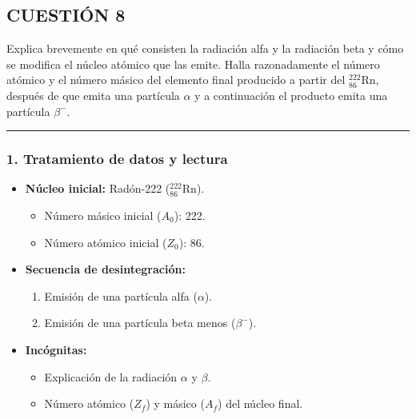 \newpage
\subsection{CUESTIÓN 8}
\label{subsec:C8_2024_jun_ord}

\begin{cajaenunciado}
Explica brevemente en qué consisten la radiación alfa y la radiación beta y cómo se modifica el núcleo atómico que las emite. Halla razonadamente el número atómico y el número másico del elemento final producido a partir del ${}_{86}^{222}\text{Rn}$, después de que emita una partícula $\alpha$ y a continuación el producto emita una partícula $\beta^{-}$.
\end{cajaenunciado}
\hrule

\subsubsection*{1. Tratamiento de datos y lectura}
\begin{itemize}
    \item \textbf{Núcleo inicial:} Radón-222 (${}_{86}^{222}\text{Rn}$).
    \begin{itemize}
        \item Número másico inicial ($A_0$): 222.
        \item Número atómico inicial ($Z_0$): 86.
    \end{itemize}
    \item \textbf{Secuencia de desintegración:}
    \begin{enumerate}
        \item Emisión de una partícula alfa ($\alpha$).
        \item Emisión de una partícula beta menos ($\beta^-$).
    \end{enumerate}
    \item \textbf{Incógnitas:}
    \begin{itemize}
        \item Explicación de la radiación $\alpha$ y $\beta$.
        \item Número atómico ($Z_f$) y másico ($A_f$) del núcleo final.
    \end{itemize}
\end{itemize}

